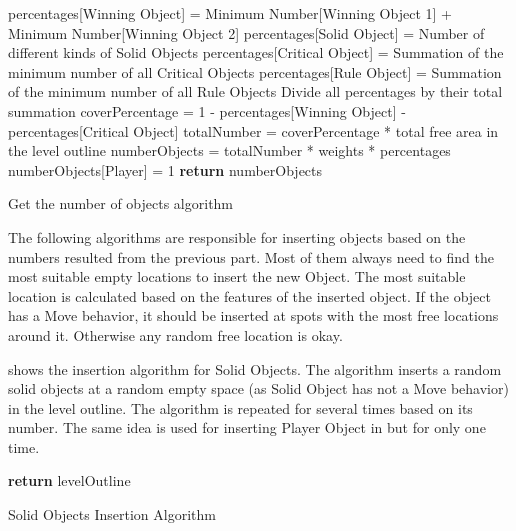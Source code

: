 \begin{algorithm}[H]
	\BlankLine
	percentages[Winning Object] = Minimum Number[Winning Object 1] + Minimum Number[Winning Object 2]\;
	percentages[Solid Object] = Number of different kinds of Solid Objects\;
	percentages[Critical Object] = Summation of the minimum number of all Critical Objects\;
	percentages[Rule Object] = Summation of the minimum number of all Rule Objects\;
	Divide all percentages by their total summation\;
	\BlankLine
	coverPercentage = 1 - percentages[Winning Object] - percentages[Critical Object]\;
	totalNumber = coverPercentage * total free area in the level outline\;
	numberObjects = totalNumber * weights * percentages\;
	numberObjects[Player] = 1\;
	\BlankLine
	\textbf{return} numberObjects\;
	\caption{Get the number of objects algorithm}
	\label{Algorithm:numberObjects}
\end{algorithm}

The following algorithms are responsible for inserting objects based on the numbers resulted from the previous part. Most of them always need to find the most suitable empty locations to insert the new Object. The most suitable location is calculated based on the features of the inserted object. If the object has a Move behavior, it should be inserted at spots with the most free locations around it. Otherwise any random free location is okay.\\\par

 shows the insertion algorithm for Solid Objects. The algorithm inserts a random solid objects at a random empty space (as Solid Object has not a Move behavior) in the level outline. The algorithm is repeated for several times based on its number. The same idea is used for inserting Player Object in  but for only one time.\\

\begin{algorithm}[H]
	\BlankLine
	\BlankLine
	\textbf{return} levelOutline\;
	\caption{Solid Objects Insertion Algorithm}
	\label{Algorithm:solidObjects}
\end{algorithm}

